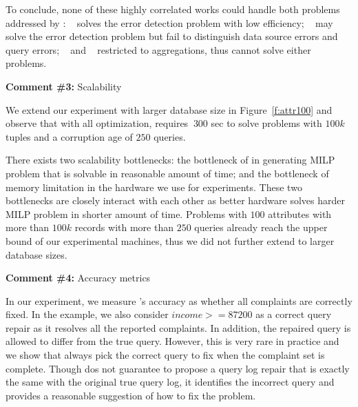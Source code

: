 To conclude, none of these highly correlated works could handle both problems
addressed by \sys: ~\cite{meliou2011tracing} solves the error detection
problem with low efficiency; ~\cite{chalamalla2014} may solve the error
detection problem but fail to distinguish data source errors and query errors;
~\cite{Wu13} and ~\cite{roy2014formal} restricted to aggregations, thus cannot
solve either problems.


\comskip

\noindent
\textbf{Comment \#3:} Scalability 
\begin{quote}
\end{quote}

We extend our experiment with larger database size in Figure~\ref{f:attr100}
and observe that with all optimization, \sys requires $~300$ sec to solve
problems with $100k$ tuples and a corruption age of $250$ queries.

There exists two scalability bottlenecks: the bottleneck of \sys in generating MILP problem that is solvable in 
reasonable amount of time; and the bottleneck of memory limitation in the hardware we use for experiments. 
These two bottlenecks are closely interact with each other as better hardware solves harder MILP problem in 
shorter amount of time. Problems with $100$ attributes with more than $100k$ records with more than $250$ queries already 
reach the upper bound of our experimental machines, thus we did not further extend \sys to larger database sizes. 




\comskip

\noindent
\textbf{Comment \#4:} Accuracy metrics
\begin{quote}
\end{quote}

In our experiment, we measure \sys's accuracy as whether all complaints are
correctly fixed. In the example, we also consider $income >= 87200$ as a
correct query repair as it resolves all the reported complaints. In addition,
the repaired query is allowed to differ from the true query. However, this is
very rare in practice and we show that \sys always pick the correct query to
fix when the complaint set is complete. Though \sys dos not guarantee to
propose a query log repair that is exactly the same with the original true
query log, it identifies the incorrect query and provides a reasonable
suggestion of how to fix the problem.



